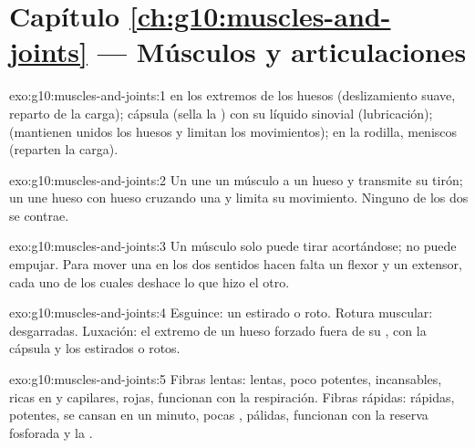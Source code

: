 \section*{Capítulo \ref{ch:g10:muscles-and-joints} --- Músculos y articulaciones}

\begin{solution}{exo:g10:muscles-and-joints:1}
 en los extremos de los huesos (deslizamiento suave, reparto
de la carga); cápsula (sella la ) con su líquido sinovial
(lubricación);  (mantienen unidos los huesos y limitan los
movimientos); en la rodilla, meniscos (reparten la carga).
\end{solution}

\begin{solution}{exo:g10:muscles-and-joints:2}
Un  une un músculo a un hueso y transmite su tirón; un 
une hueso con hueso cruzando una  y limita su movimiento.
Ninguno de los dos se contrae.
\end{solution}

\begin{solution}{exo:g10:muscles-and-joints:3}
Un músculo solo puede tirar acortándose; no puede empujar. Para mover
una  en los dos sentidos hacen falta un flexor y un
extensor, cada uno de los cuales deshace lo que hizo el otro.
\end{solution}

\begin{solution}{exo:g10:muscles-and-joints:4}
Esguince: un  estirado o roto. Rotura muscular:  desgarradas. Luxación: el extremo de un hueso forzado fuera
de su , con la cápsula y los  estirados o rotos.
\end{solution}

\begin{solution}{exo:g10:muscles-and-joints:5}
Fibras lentas: lentas, poco potentes, incansables, ricas en
 y capilares, rojas, funcionan con la respiración. Fibras
rápidas: rápidas, potentes, se cansan en un minuto, pocas ,
pálidas, funcionan con la reserva fosforada y la .
\end{solution}

